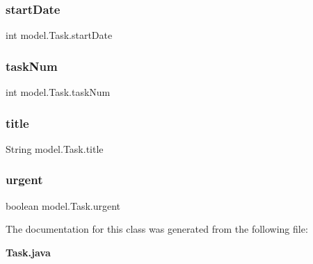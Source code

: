 \mbox{\label{classmodel_1_1_task_a3fa64c593500922a3f10c77c1a42cf91}} 
\subsubsection{start\+Date}
{\footnotesize\ttfamily int model.\+Task.\+start\+Date\hspace{0.3cm}{\ttfamily [private]}}

\mbox{\label{classmodel_1_1_task_aaa3ff5a8f7c1d074bf8c5e0a4ac1318c}} 
\subsubsection{task\+Num}
{\footnotesize\ttfamily int model.\+Task.\+task\+Num\hspace{0.3cm}{\ttfamily [private]}}

\mbox{\label{classmodel_1_1_task_a34c52d9ff8e7da7d626571734c42c3d8}} 
\subsubsection{title}
{\footnotesize\ttfamily String model.\+Task.\+title\hspace{0.3cm}{\ttfamily [private]}}

\mbox{\label{classmodel_1_1_task_a08eb26f1c8329a6be8142fab23597b94}} 
\subsubsection{urgent}
{\footnotesize\ttfamily boolean model.\+Task.\+urgent\hspace{0.3cm}{\ttfamily [private]}}



The documentation for this class was generated from the following file\+:\begin{DoxyCompactItemize}
\item 
\textbf{ Task.\+java}\end{DoxyCompactItemize}
